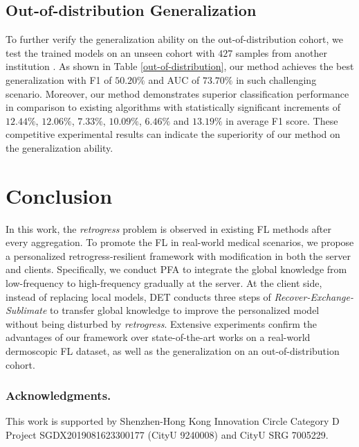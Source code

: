 \documentclass[runningheads]{llncs}
\begin{document}
\subsection{Out-of-distribution Generalization}
To further verify the generalization ability on the out-of-distribution cohort, we test the trained models on an unseen cohort with $427$ samples from another institution \cite{ham10k}.
As shown in Table \ref{out-of-distribution}, our method achieves the best generalization with F1 of $50.20\%$ and AUC of $73.70\%$ in such challenging scenario. Moreover, our method demonstrates superior classification performance in comparison to existing algorithms \cite{fedavg,fedprox,andreux2020siloed,yeganeh2020inverse,li2021fedbn,federated_mutual} with statistically significant increments of $12.44\%$, $12.06\%$, $7.33\%$, $10.09\%$, $6.46\%$ and $13.19\%$ in average F1 score. These competitive experimental results can indicate the superiority of our method on the generalization ability. 
\section{Conclusion}
In this work, the \textit{retrogress} problem is observed in existing FL methods after every aggregation.
To promote the FL in real-world medical scenarios, we propose a personalized retrogress-resilient framework with modification in both the server and clients.  Specifically, we conduct PFA to integrate the global knowledge from low-frequency to high-frequency gradually at the server.
At the client side, instead of replacing local models, DET 
conducts three steps of \textit{Recover-Exchange-Sublimate} to transfer global knowledge to improve the personalized model without being disturbed by \textit{retrogress}.
Extensive experiments confirm the advantages of our framework over state-of-the-art works on a real-world dermoscopic FL dataset, as well as the generalization on an out-of-distribution cohort. 

\subsubsection{Acknowledgments.} This work is supported by Shenzhen-Hong Kong Innovation Circle Category D Project SGDX2019081623300177 (CityU 9240008) and CityU SRG 7005229.

%
%
%


%
\end{document}
